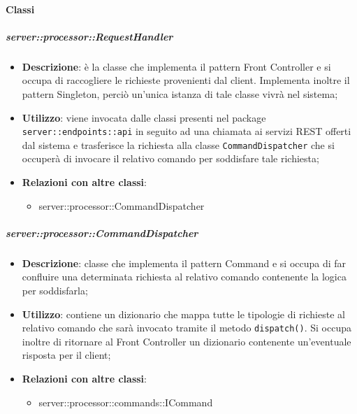   \paragraph{Classi} %

    \subparagraph{server::processor::RequestHandler} %
    \label{subp:bdsm_app_server_processor_requesthandler}
    \begin{itemize}
      \item \textbf{Descrizione}: è la classe che implementa il pattern Front Controller e si occupa di raccogliere le richieste provenienti dal client. Implementa inoltre il pattern Singleton, perciò un'unica istanza di tale classe vivrà nel sistema;
      \item \textbf{Utilizzo}: viene invocata dalle classi presenti nel package \texttt{server::endpoints::api} in seguito ad una chiamata ai servizi REST offerti dal sistema e trasferisce la richiesta alla classe \texttt{CommandDispatcher} che si occuperà di invocare il relativo comando per soddisfare tale richiesta;
      \item \textbf{Relazioni con altre classi}:
        \begin{itemize}
          \item server::processor::CommandDispatcher
        \end{itemize}
      \end{itemize}

    \subparagraph{server::processor::CommandDispatcher} %
    \label{subp:bdsm_app_server_:processor_commanddispatcher}
    \begin{itemize}
      \item \textbf{Descrizione}: classe che implementa il pattern Command e si occupa di far confluire una determinata richiesta al relativo comando contenente la logica per soddisfarla;
      \item \textbf{Utilizzo}: contiene un dizionario che mappa tutte le tipologie di richieste al relativo comando che sarà invocato tramite il metodo \texttt{dispatch()}. Si occupa inoltre di ritornare al Front Controller un dizionario contenente un'eventuale risposta per il client;
      \item \textbf{Relazioni con altre classi}:
        \begin{itemize}
          \item server::processor::commands::ICommand
        \end{itemize}
      \end{itemize}

